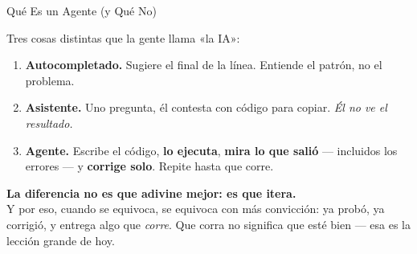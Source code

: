 \documentclass[aspectratio=169, 11pt]{beamer}
\begin{document}
\begin{frame}[shrink=5]{Qué Es un Agente (y Qué No)}
  \vspace{2pt}
  {\footnotesize\color{textMuted}
  Tres cosas distintas que la gente llama «la IA»:
  \begin{enumerate}\setlength{\itemsep}{6pt}
    \item[{\color{textMuted}\scriptsize\faCircle}]
      \textbf{Autocompletado.} Sugiere el final de la línea. Entiende el
      patrón, no el problema.
    \item[{\color{arcaRed}\scriptsize\faCircle}]
      \textbf{Asistente.} Uno pregunta, él contesta con código para copiar.
      \emph{Él no ve el resultado.}
    \item[{\color{codeGreen}\scriptsize\faCircle}]
      \textbf{Agente.} Escribe el código, \textbf{lo ejecuta}, \textbf{mira
      lo que salió} --- incluidos los errores --- y \textbf{corrige solo}.
      Repite hasta que corre.
  \end{enumerate}}
  \vspace{7pt}
  \begin{tcolorbox}[colback=arcaGray, colframe=codeGreen, boxrule=0pt,
    leftrule=4pt, arc=3pt, left=10pt, right=10pt, top=6pt, bottom=6pt]
    {\footnotesize\color{arcaDark}\bfseries
     La diferencia no es que adivine mejor: es que \textbf{itera}.}\\[4pt]
    {\footnotesize\color{textMuted}
     Y por eso, cuando se equivoca, se equivoca con más convicción: ya
     probó, ya corrigió, y entrega algo que \emph{corre}. Que corra no
     significa que esté bien --- esa es la lección grande de hoy.}
  \end{tcolorbox}
\end{frame}
\end{document}
